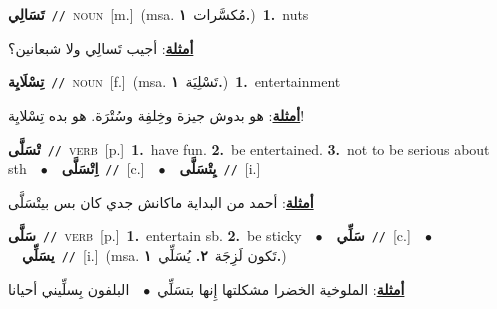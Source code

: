 \documentclass[10pt,a4paper,twoside]{article} %
\begin{document}
\begin{multicols}{2}
{\setlength\topsep{0pt}\textbf{\foreignlanguage{arabic}{تَسَالِي}}\ {\color{gray}\texttt{//}\color{black}}\ \textsc{noun}\ [m.]\ \color{gray}(msa. \foreignlanguage{arabic}{مُكسَّرات}~\foreignlanguage{arabic}{\textbf{١.}})\color{black}\ \textbf{1.}~nuts\  \begin{flushright}\color{gray}\foreignlanguage{arabic}{\textbf{\underline{\foreignlanguage{arabic}{أمثلة}}}: أجيب تَسالِي ولا شبعانين؟}\end{flushright}\color{black}} \vspace{2mm}

{\setlength\topsep{0pt}\textbf{\foreignlanguage{arabic}{تِسْلَايِة}}\ {\color{gray}\texttt{//}\color{black}}\ \textsc{noun}\ [f.]\ \color{gray}(msa. \foreignlanguage{arabic}{تَسْلِيَة}~\foreignlanguage{arabic}{\textbf{١.}})\color{black}\ \textbf{1.}~entertainment\  \begin{flushright}\color{gray}\foreignlanguage{arabic}{\textbf{\underline{\foreignlanguage{arabic}{أمثلة}}}: هو بدوش جيزة وخِلفِة وسُتْرَة. هو بده تِسْلايِة!}\end{flushright}\color{black}} \vspace{2mm}

{\setlength\topsep{0pt}\textbf{\foreignlanguage{arabic}{تْسَلَّى}}\ {\color{gray}\texttt{//}\color{black}}\ \textsc{verb}\ [p.]\ \textbf{1.}~have fun.  \textbf{2.}~be entertained.  \textbf{3.}~not to be serious about sth\ \ $\bullet$\ \ \setlength\topsep{0pt}\textbf{\foreignlanguage{arabic}{اِتْسَلَّى}}\ {\color{gray}\texttt{//}\color{black}}\ [c.]\ \ $\bullet$\ \ \setlength\topsep{0pt}\textbf{\foreignlanguage{arabic}{يِتْسَلَّى}}\ {\color{gray}\texttt{//}\color{black}}\ [i.]\  \begin{flushright}\color{gray}\foreignlanguage{arabic}{\textbf{\underline{\foreignlanguage{arabic}{أمثلة}}}: أحمد من البداية ماكانش جدي كان بس بيتْسَلَّى}\end{flushright}\color{black}} \vspace{2mm}

{\setlength\topsep{0pt}\textbf{\foreignlanguage{arabic}{سَلَّى}}\ {\color{gray}\texttt{//}\color{black}}\ \textsc{verb}\ [p.]\ \textbf{1.}~entertain sb.  \textbf{2.}~be sticky\ \ $\bullet$\ \ \setlength\topsep{0pt}\textbf{\foreignlanguage{arabic}{سَلِّي}}\ {\color{gray}\texttt{//}\color{black}}\ [c.]\ \ $\bullet$\ \ \setlength\topsep{0pt}\textbf{\foreignlanguage{arabic}{يسَلِّي}}\ {\color{gray}\texttt{//}\color{black}}\ [i.]\ \color{gray}(msa. \foreignlanguage{arabic}{تَكون لَزِجَة}~\foreignlanguage{arabic}{\textbf{٢.}}  \foreignlanguage{arabic}{يُسَلِّي}~\foreignlanguage{arabic}{\textbf{١.}})\color{black}\  \begin{flushright}\color{gray}\foreignlanguage{arabic}{\textbf{\underline{\foreignlanguage{arabic}{أمثلة}}}: الملوخية الخضرا مشكلتها إِنها بتسَلِّي\ $\bullet$\ \  البلفون بِسلِّيني أحيانا}\end{flushright}\color{black}} \vspace{2mm}


\end{multicols}
\end{document}
